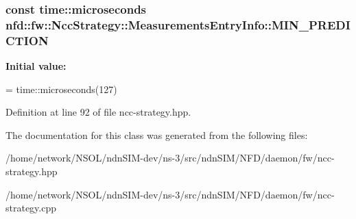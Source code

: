 \subsubsection[{\texorpdfstring{M\+I\+N\+\_\+\+P\+R\+E\+D\+I\+C\+T\+I\+ON}{MIN\_PREDICTION}}]{\setlength{\rightskip}{0pt plus 5cm}const time\+::microseconds nfd\+::fw\+::\+Ncc\+Strategy\+::\+Measurements\+Entry\+Info\+::\+M\+I\+N\+\_\+\+P\+R\+E\+D\+I\+C\+T\+I\+ON\hspace{0.3cm}{\ttfamily [static]}}\hypertarget{classnfd_1_1fw_1_1NccStrategy_1_1MeasurementsEntryInfo_a80580a1aaad3bddd193e22d4f74b9dba}{}\label{classnfd_1_1fw_1_1NccStrategy_1_1MeasurementsEntryInfo_a80580a1aaad3bddd193e22d4f74b9dba}
{\bfseries Initial value\+:}
\begin{DoxyCode}
=
                                                             time::microseconds(127)
\end{DoxyCode}


Definition at line 92 of file ncc-\/strategy.\+hpp.



The documentation for this class was generated from the following files\+:\begin{DoxyCompactItemize}
\item 
/home/network/\+N\+S\+O\+L/ndn\+S\+I\+M-\/dev/ns-\/3/src/ndn\+S\+I\+M/\+N\+F\+D/daemon/fw/ncc-\/strategy.\+hpp\item 
/home/network/\+N\+S\+O\+L/ndn\+S\+I\+M-\/dev/ns-\/3/src/ndn\+S\+I\+M/\+N\+F\+D/daemon/fw/ncc-\/strategy.\+cpp\end{DoxyCompactItemize}
